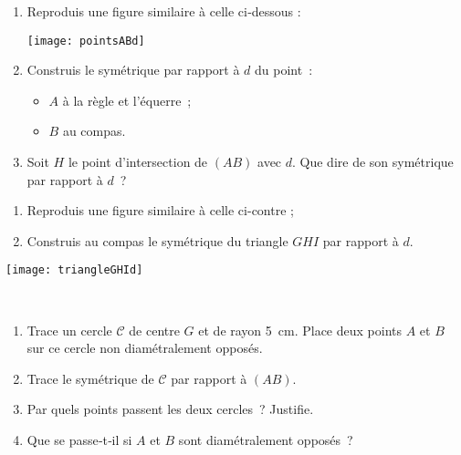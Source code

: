 \newpage

\begin{exercice}
\begin{enumerate}
 \item Reproduis une figure similaire à celle ci‑dessous :
 \begin{center} \texttt{[image: pointsABd]} \end{center}
 \item Construis le symétrique par rapport à $d$ du point :
 \begin{itemize}
  \item $A$ à la règle et l'équerre ;
  \item $B$ au compas.
  \end{itemize}   
 \item Soit $H$ le point d'intersection de $(AB)$ avec $d$. Que dire de son symétrique par rapport à $d$ ?
 \end{enumerate} 
\end{exercice}


\begin{exercice}
\begin{minipage}[c]{0.52\linewidth}
\begin{enumerate}
 \item Reproduis une figure similaire à celle ci-contre ;
 \item Construis au compas le symétrique du triangle $GHI$ par rapport à $d$.
 \end{enumerate}
 \end{minipage} \hfill%
 \begin{minipage}[c]{0.44\linewidth}
  \texttt{[image: triangleGHId]}
   \end{minipage} \\
\end{exercice}


\begin{exercice}
\begin{enumerate}
 \item Trace un cercle $\mathcal{C}$ de centre $G$ et de rayon 5 cm. Place deux points $A$ et $B$ sur ce cercle non diamétralement opposés.
 \item Trace le symétrique de $\mathcal{C}$ par rapport à $(AB)$.
 \item Par quels points passent les deux cercles ? Justifie.
 \item Que se passe‑t‑il si $A$ et $B$ sont diamétralement opposés ?
 \end{enumerate}
\end{exercice}


